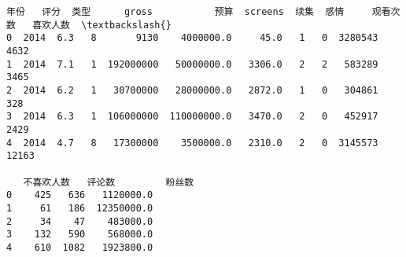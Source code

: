             \begin{tcolorbox}[breakable, size=fbox, boxrule=.5pt, pad at break*=1mm, opacityfill=0]
\begin{Verbatim}[commandchars=\\\{\}]
     年份   评分  类型      gross           预算  screens  续集  感情     观看次数   喜欢人数  \textbackslash{}
0  2014  6.3   8       9130    4000000.0     45.0   1   0  3280543   4632
1  2014  7.1   1  192000000   50000000.0   3306.0   2   2   583289   3465
2  2014  6.2   1   30700000   28000000.0   2872.0   1   0   304861    328
3  2014  6.3   1  106000000  110000000.0   3470.0   2   0   452917   2429
4  2014  4.7   8   17300000    3500000.0   2310.0   2   0  3145573  12163

   不喜欢人数   评论数         粉丝数
0    425   636   1120000.0
1     61   186  12350000.0
2     34    47    483000.0
3    132   590    568000.0
4    610  1082   1923800.0
\end{Verbatim}
\end{tcolorbox}
